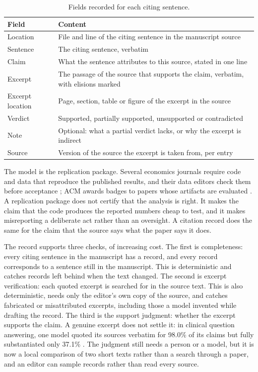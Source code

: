 \documentclass[11pt]{article}
\begin{document}
\begin{table}[t]
\centering
\caption{Fields recorded for each citing sentence.}
\label{tab:fields}
\begin{tabularx}{\linewidth}{@{}lX@{}}
\toprule
Field & Content \\
\midrule
Location & File and line of the citing sentence in the manuscript source \\
Sentence & The citing sentence, verbatim \\
Claim & What the sentence attributes to this source, stated in one line \\
Excerpt & The passage of the source that supports the claim, verbatim, with elisions marked \\
Excerpt location & Page, section, table or figure of the excerpt in the source \\
Verdict & Supported, partially supported, unsupported or contradicted \\
Note & Optional: what a partial verdict lacks, or why the excerpt is indirect \\
Source & Version of the source the excerpt is taken from, per entry \\
\bottomrule
\end{tabularx}
\end{table}

The model is the replication package. Several economics journals require code and data that reproduce the published results, and their data editors check them before acceptance \citep{aea2026datapolicy,es2026reproducibility}; ACM awards badges to papers whose artifacts are evaluated \citep{acm2020badging}. A replication package does not certify that the analysis is right. It makes the claim that the code produces the reported numbers cheap to test, and it makes misreporting a deliberate act rather than an oversight. A citation record does the same for the claim that the source says what the paper says it does.

The record supports three checks, of increasing cost. The first is completeness: every citing sentence in the manuscript has a record, and every record corresponds to a sentence still in the manuscript. This is deterministic and catches records left behind when the text changed. The second is excerpt verification: each quoted excerpt is searched for in the source text. This is also deterministic, needs only the editor's own copy of the source, and catches fabricated or misattributed excerpts, including those a model invented while drafting the record. The third is the support judgment: whether the excerpt supports the claim. A genuine excerpt does not settle it: in clinical question answering, one model quoted its sources verbatim for 98.0\% of its claims but fully substantiated only 37.1\% \citep{zhang2026verifiable}. The judgment still needs a person or a model, but it is now a local comparison of two short texts rather than a search through a paper, and an editor can sample records rather than read every source.
\end{document}
